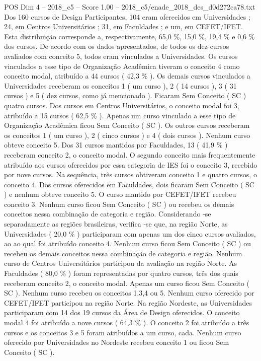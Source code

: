 \begin{textsample}{POS Dim 4 – 2018\_c5 – Score 1.00 – 2018\_c5/enade\_2018\_des\_d0d272ca78.txt}
Dos 160 cursos de Design Participantes, 104 eram oferecidos em Universidades ; 24, em Centros Universitários ; 31, em Faculdades ; e um, em CEFET/IFET.
Esta distribuição corresponde a, respectivamente, 65,0 \%, 15,0 \%, 19,4 \% e 0,6 \% dos cursos.
De acordo com os dados apresentados, de todos os dez cursos avaliados com conceito 5, todos eram vinculados a Universidades.
Os cursos vinculados a esse tipo de Organização Acadêmica tiveram o conceito 4 como conceito modal, atribuído a 44 cursos ( 42,3 \% ).
Os demais cursos vinculados a Universidades receberam os conceitos 1 ( um curso ), 2 ( 14 cursos ), 3 ( 31 cursos ) e 5 ( dez cursos, como já mencionado ).
Ficaram Sem Conceito ( SC ) quatro cursos.
Dos cursos em Centros Universitários, o conceito modal foi 3, atribuído a 15 cursos ( 62,5 \% ).
Apenas um curso vinculado a esse tipo de Organização Acadêmica ficou Sem Conceito ( SC ).
Os outros cursos receberam os conceitos 1 ( um curso ), 2 ( cinco cursos ) e 4 ( dois cursos ).
Nenhum curso obteve conceito 5.
Dos 31 cursos mantidos por Faculdades, 13 ( 41,9 \% ) receberam conceito 2, o conceito modal.
O segundo conceito mais frequentemente atribuído aos cursos oferecidos por essa categoria de IES foi o conceito 3, recebido por nove cursos.
Na sequência, três cursos obtiveram conceito 1 e quatro cursos, o conceito 4.
Dos cursos oferecidos em Faculdades, dois ficaram Sem Conceito ( SC ) e nenhum obteve conceito 5.
O curso mantido por CEFET/IFET recebeu conceito 3.
Nenhum curso ficou Sem Conceito ( SC ) ou recebeu os demais conceitos nessa combinação de categoria e região.
Considerando -se separadamente as regiões brasileiras, verifica -se que, na região Norte, as Universidades ( 20,0 \% ) participaram com apenas um dos cinco cursos avaliados, ao ao qual foi atribuído conceito 4.
Nenhum curso ficou Sem Conceito ( SC ) ou recebeu os demais conceitos nessa combinação de categoria e região.
Nenhum curso de Centros Universitários participou da avaliação na região Norte.
As Faculdades ( 80,0 \% ) foram representadas por quatro cursos, três dos quais receberam conceito 2, o conceito modal.
Apenas um curso ficou Sem Conceito ( SC ).
Nenhum curso recebeu os conceitos 1,3,4 ou 5.
Nenhum curso oferecido por CEFET/IFET participou na região Norte.
Na região Nordeste, as Universidades participaram com 14 dos 19 cursos da Área de Design oferecidos.
O conceito modal 4 foi atribuído a nove cursos ( 64,3 \% ).
O conceito 2 foi atribuído a três cursos e os conceitos 3 e 5 foram atribuídos a um curso, cada.
Nenhum curso oferecido por Universidades no Nordeste recebeu conceito 1 ou ficou Sem Conceito ( SC ).

\end{textsample}
